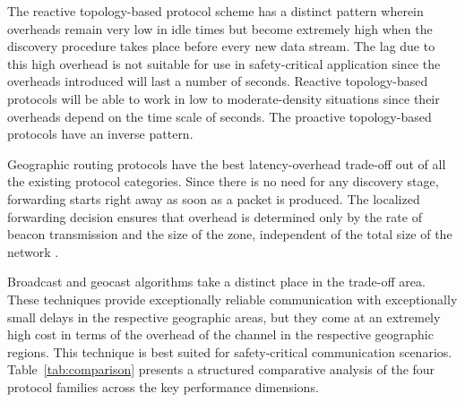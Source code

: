 \documentclass[12pt]{article}
\begin{document}
The reactive topology-based protocol scheme has a distinct pattern wherein overheads remain very low in idle times but become extremely high when the discovery procedure takes place before every new data stream. The lag due to this high overhead is not suitable for use in safety-critical application since the overheads introduced will last a number of seconds. Reactive topology-based protocols will be able to work in low to moderate-density situations since their overheads depend on the time scale of seconds. The proactive topology-based protocols have an inverse pattern.

Geographic routing protocols have the best latency-overhead trade-off out of all the existing protocol categories. Since there is no need for any discovery stage, forwarding starts right away as soon as a packet is produced. The localized forwarding decision ensures that overhead is determined only by the rate of beacon transmission and the size of the zone, independent of the total size of the network \cite{mauve2001survey}.

Broadcast and geocast algorithms take a distinct place in the trade-off area. These techniques provide exceptionally reliable communication with exceptionally small delays in the respective geographic areas, but they come at an extremely high cost in terms of the overhead of the channel in the respective geographic regions. This technique is best suited for safety-critical communication scenarios.
Table~\ref{tab:comparison} presents a structured comparative analysis of the four protocol families across the key performance dimensions.
\end{document}
